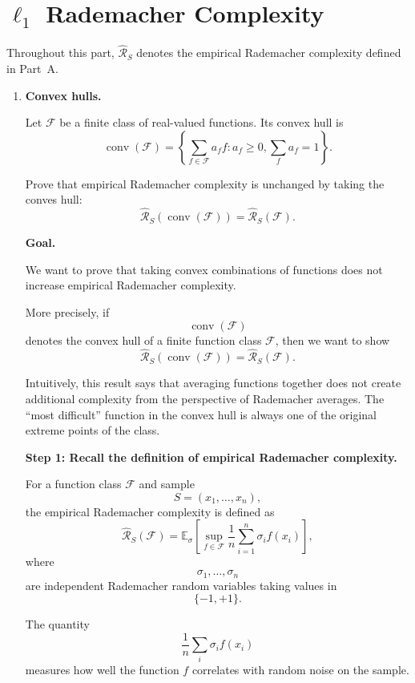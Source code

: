 \documentclass[11pt]{article}
\newcommand{\E}{\mathbb{E}}
\begin{document}
\section{$\ell_1$ Rademacher Complexity}
Throughout this part, $\widehat{\mathcal{R}}_{S}$ denotes the empirical Rademacher 
complexity defined in Part~A.
\begin{enumerate}

\item \textbf{Convex hulls.}

Let $\mathcal F$ be a finite class of real-valued functions. Its convex hull is
\[
\operatorname{conv}(\mathcal F)
=
\left\{
\sum_{f\in\mathcal F}a_ff:
a_f\ge0,
\sum_fa_f=1
\right\}.
\]

Prove that empirical Rademacher complexity is unchanged by taking the conves hull:
\[
\widehat{\mathcal R}_S(\operatorname{conv}(\mathcal F))
=
\widehat{\mathcal R}_S(\mathcal F).
\]

\begin{solutionbox}

\textbf{Goal.}

We want to prove that taking convex combinations of functions does not increase empirical Rademacher complexity.

More precisely, if
\[
\operatorname{conv}(\mathcal F)
\]
denotes the convex hull of a finite function class $\mathcal F$, then we want to show
\[
\widehat{\mathcal R}_S(\operatorname{conv}(\mathcal F))
=
\widehat{\mathcal R}_S(\mathcal F).
\]

Intuitively, this result says that averaging functions together does not create additional complexity from the perspective of Rademacher averages. The ``most difficult'' function in the convex hull is always one of the original extreme points of the class.

\medskip

\textbf{Step 1: Recall the definition of empirical Rademacher complexity.}

For a function class $\mathcal F$ and sample
\[
S=(x_1,\ldots,x_n),
\]
the empirical Rademacher complexity is defined as
\[
\widehat{\mathcal R}_S(\mathcal F)
=
\E_\sigma
\left[
\sup_{f\in\mathcal F}
\frac1n
\sum_{i=1}^n
\sigma_if(x_i)
\right],
\]
where
\[
\sigma_1,\ldots,\sigma_n
\]
are independent Rademacher random variables taking values in
\[
\{-1,+1\}.
\]

The quantity
\[
\frac1n\sum_i\sigma_if(x_i)
\]
measures how well the function $f$ correlates with random noise on the sample.


\end{solutionbox}
\end{enumerate}
\end{document}
